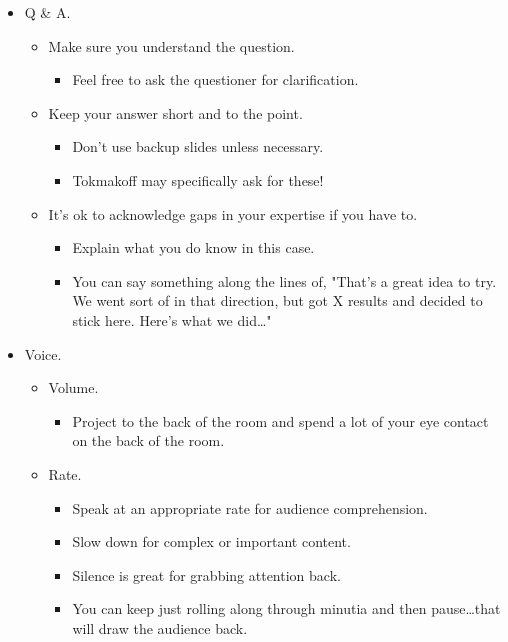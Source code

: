 \documentclass[../notes.tex]{subfiles}
\begin{document}
\begin{itemize}
    \item Q \& A.
    \begin{itemize}
        \item Make sure you understand the question.
        \begin{itemize}
            \item Feel free to ask the questioner for clarification.
        \end{itemize}
        \item Keep your answer short and to the point.
        \begin{itemize}
            \item Don't use backup slides unless necessary.
            \item Tokmakoff may specifically ask for these!
        \end{itemize}
        \item It's ok to acknowledge gaps in your expertise if you have to.
        \begin{itemize}
            \item Explain what you do know in this case.
            \item You can say something along the lines of, "That's a great idea to try. We went sort of in that direction, but got X results and decided to stick here. Here's what we did\dots"
        \end{itemize}
    \end{itemize}
    \item Voice.
    \begin{itemize}
        \item Volume.
        \begin{itemize}
            \item Project to the back of the room and spend a lot of your eye contact on the back of the room.
        \end{itemize}
        \item Rate.
        \begin{itemize}
            \item Speak at an appropriate rate for audience comprehension.
            \item Slow down for complex or important content.
            \item Silence is great for grabbing attention back.
            \item You can keep just rolling along through minutia and then pause\dots that will draw the audience back.
        \end{itemize}

\end{itemize}
\end{itemize}
\end{document}
